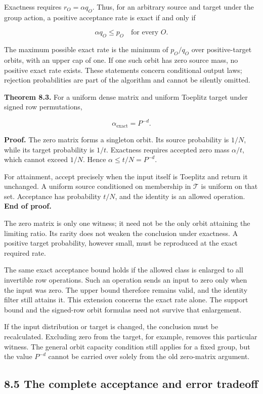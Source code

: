 \documentclass[
]{article}
\begin{document}
Exactness requires \(r_O=\alpha q_O\). Thus, for an arbitrary source and
target under the group action, a positive acceptance rate is exact if
and only if

\[
\alpha q_O\le p_O\quad\text{for every }O.
\]

The maximum possible exact rate is the minimum of \(p_O/q_O\) over
positive-target orbits, with an upper cap of one. If one such orbit has
zero source mass, no positive exact rate exists. These statements
concern conditional output laws; rejection probabilities are part of the
algorithm and cannot be silently omitted.

\textbf{Theorem 8.3.} For a uniform dense matrix and uniform Toeplitz
target under signed row permutations,

\[
\alpha_{\mathrm{exact}}=P^{-d}.
\]

\textbf{Proof.} The zero matrix forms a singleton orbit. Its source
probability is \(1/N\), while its target probability is \(1/t\).
Exactness requires accepted zero mass \(\alpha/t\), which cannot exceed
\(1/N\). Hence \(\alpha\le t/N=P^{-d}\).

For attainment, accept precisely when the input itself is Toeplitz and
return it unchanged. A uniform source conditioned on membership in
\(\mathcal T\) is uniform on that set. Acceptance has probability
\(t/N\), and the identity is an allowed operation. \textbf{End of
proof.}

The zero matrix is only one witness; it need not be the only orbit
attaining the limiting ratio. Its rarity does not weaken the conclusion
under exactness. A positive target probability, however small, must be
reproduced at the exact required rate.

The same exact acceptance bound holds if the allowed class is enlarged
to all invertible row operations. Such an operation sends an input to
zero only when the input was zero. The upper bound therefore remains
valid, and the identity filter still attains it. This extension concerns
the exact rate alone. The support bound and the signed-row orbit
formulas need not survive that enlargement.

If the input distribution or target is changed, the conclusion must be
recalculated. Excluding zero from the target, for example, removes this
particular witness. The general orbit capacity condition still applies
for a fixed group, but the value \(P^{-d}\) cannot be carried over
solely from the old zero-matrix argument.

\subsection{8.5 The complete acceptance and error
tradeoff}\label{the-complete-acceptance-and-error-tradeoff}
\end{document}
